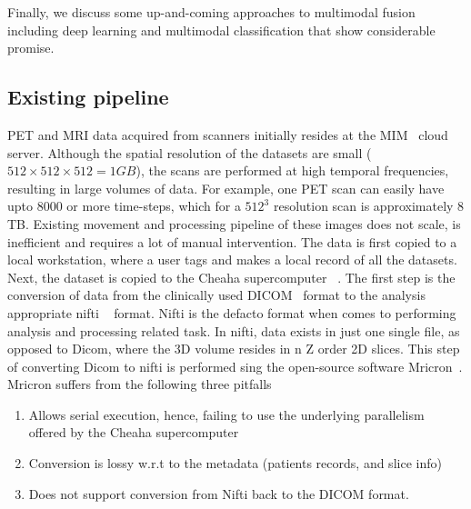 \documentclass[11pt]{article}
\begin{document}

Finally, we discuss some up-and-coming approaches to multimodal fusion
including deep learning and multimodal classification that show considerable promise.


\subsection{Existing pipeline}
PET and MRI data acquired from scanners initially resides at the MIM~\cite{} cloud server. Although the spatial resolution of the datasets are small ($512 \times 512 \times 512 = 1 GB$), the scans are performed at high temporal frequencies, resulting in large volumes of data. For example, one PET scan can easily have upto 8000 or more time-steps, which for a $512^3$ resolution scan is approximately $8$ TB. Existing movement and processing pipeline of these images does not scale, is inefficient and requires a lot of manual intervention. The data is first copied to a local workstation, where a user tags and makes a local record of all the datasets. Next, the dataset is copied to the Cheaha supercomputer ~\cite{bibid}. The first step is the conversion of data from the clinically used DICOM~\cite{} format to the analysis appropriate nifti ~\cite{} format. Nifti is the defacto format when comes to performing analysis and processing related task. In nifti, data exists in just one single file, as opposed to Dicom, where the 3D volume resides in n Z order 2D slices. This step of converting Dicom to nifti is performed sing the open-source software Mricron~\cite{}. Mricron suffers from the following three pitfalls
\begin{enumerate}
	\setlength\itemsep{-0.2em}
	\item Allows serial execution, hence, failing to use the underlying parallelism offered by the Cheaha supercomputer
	\item Conversion is lossy w.r.t to the metadata (patients records, and slice info)
	\item Does not support conversion from Nifti back to the DICOM format.
\end{enumerate}
\end{document}
